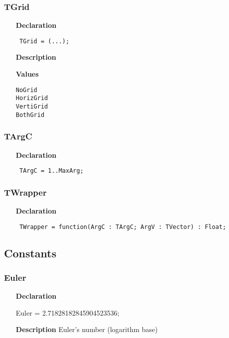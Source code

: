 \documentclass[12pt,a4paper,oneside]{report}
\newcommand{\lmathsix}[1]{   %
	\marginpar{\vspace{#1} 
		\begin{flushright}
			LMath 0.6
	\end{flushright} }
}
\newcommand{\declarationitem}[1]{\textbf{#1}}
\newcommand{\descriptiontitle}[1]{\textbf{#1}}
\newcommand{\code}[1]{\texttt{#1}}
\begin{document}
\subsubsection{TGrid}
\label{utypes-TGrid}
\begin{itemize}\item[\declarationitem{Declaration}\hfill]
	\begin{flushleft}
		\code{
			TGrid = (...);}
	\end{flushleft}
	\item[\descriptiontitle{Description}]
	\item[\textbf{Values}]
	\begin{description}
		\item[\texttt{NoGrid}]  
		\item[\texttt{HorizGrid}]  
		\item[\texttt{VertiGrid}]  
		\item[\texttt{BothGrid}]  
	\end{description}
\end{itemize}

\subsubsection{TArgC}
\label{utypes-TArgC}
\begin{itemize}\item[\declarationitem{Declaration}\hfill]
	\begin{flushleft}
		\code{
			TArgC = 1..MaxArg;}
	\end{flushleft}
\end{itemize}

\subsubsection{TWrapper}
\label{utypes-TWrapper}
\begin{itemize}\item[\declarationitem{Declaration}\hfill]
	\begin{flushleft}
		\code{
			TWrapper = function(ArgC : TArgC; ArgV : TVector) : Float;}
	\end{flushleft}
\end{itemize}

\subsection{Constants}
\subsubsection{Euler}
\label{utypes-Euler}\lmathsix{-24pt}
\begin{itemize}
	\item[\declarationitem{Declaration}\hfill]
	\begin{flushleft}
		Euler = 2.71828182845904523536;
	\end{flushleft}
	\item[\descriptiontitle{Description}]
	Euler's number (logarithm base)
\end{itemize}
\end{document}
